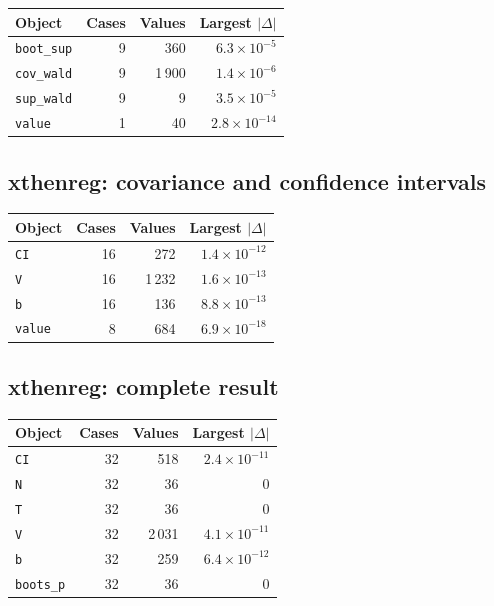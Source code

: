 \documentclass[10.5pt,a4paper]{article}
\begin{document}
\begin{longtable}{@{}p{8.2cm}rrr@{}}
\toprule
Object & Cases & Values & Largest $|\Delta|$ \\
\midrule
\endhead
\texttt{boot\_\allowbreak{}sup} & 9 & 360 & $6.3\times10^{-5}$ \\
\texttt{cov\_\allowbreak{}wald} & 9 & 1\,900 & $1.4\times10^{-6}$ \\
\texttt{sup\_\allowbreak{}wald} & 9 & 9 & $3.5\times10^{-5}$ \\
\texttt{value} & 1 & 40 & $2.8\times10^{-14}$ \\
\bottomrule
\end{longtable}

\subsection*{xthenreg: covariance and confidence intervals}

\begin{longtable}{@{}p{8.2cm}rrr@{}}
\toprule
Object & Cases & Values & Largest $|\Delta|$ \\
\midrule
\endhead
\texttt{CI} & 16 & 272 & $1.4\times10^{-12}$ \\
\texttt{V} & 16 & 1\,232 & $1.6\times10^{-13}$ \\
\texttt{b} & 16 & 136 & $8.8\times10^{-13}$ \\
\texttt{value} & 8 & 684 & $6.9\times10^{-18}$ \\
\bottomrule
\end{longtable}

\subsection*{xthenreg: complete result}

\begin{longtable}{@{}p{8.2cm}rrr@{}}
\toprule
Object & Cases & Values & Largest $|\Delta|$ \\
\midrule
\endhead
\texttt{CI} & 32 & 518 & $2.4\times10^{-11}$ \\
\texttt{N} & 32 & 36 & 0 \\
\texttt{T} & 32 & 36 & 0 \\
\texttt{V} & 32 & 2\,031 & $4.1\times10^{-11}$ \\
\texttt{b} & 32 & 259 & $6.4\times10^{-12}$ \\
\texttt{boots\_\allowbreak{}p} & 32 & 36 & 0 \\
\bottomrule
\end{longtable}
\end{document}
